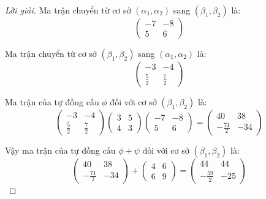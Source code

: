 \begin{proof}[Lời giải]
    Ma trận chuyển từ cơ sở $(\alpha_{1}, \alpha_{2})$ sang $(\beta_{1}, \beta_{2})$ là:
    \[
        \begin{pmatrix}
            -7 & -8 \\
            5  & 6
        \end{pmatrix}
    \]
    
    Ma trận chuyển từ cơ sở $(\beta_{1}, \beta_{2})$ sang $(\alpha_{1}, \alpha_{2})$ là:
    \[
        \begin{pmatrix}
            -3          & -4          \\
            \frac{5}{2} & \frac{7}{2}
        \end{pmatrix}
    \]
    
    Ma trận của tự đồng cấu $\phi$ đối với cơ sở $(\beta_{1}, \beta_{2})$ là:
    \[
        \begin{pmatrix}
            -3          & -4          \\
            \frac{5}{2} & \frac{7}{2}
        \end{pmatrix}
        \begin{pmatrix}
            3 & 5 \\
            4 & 3
        \end{pmatrix}
        \begin{pmatrix}
            -7 & -8 \\
            5  & 6
        \end{pmatrix}
        =
        \begin{pmatrix}
            40            & 38  \\
            -\frac{71}{2} & -34
        \end{pmatrix}
    \]
    
    Vậy ma trận của tự đồng cấu $\phi + \psi$ đối với cơ sở $(\beta_{1}, \beta_{2})$ là:
    \[
        \begin{pmatrix}
            40            & 38  \\
            -\frac{71}{2} & -34
        \end{pmatrix}
        +
        \begin{pmatrix}
            4 & 6 \\
            6 & 9
        \end{pmatrix}
        =
        \begin{pmatrix}
            44            & 44  \\
            -\frac{59}{2} & -25
        \end{pmatrix}
    \]
\end{proof}


